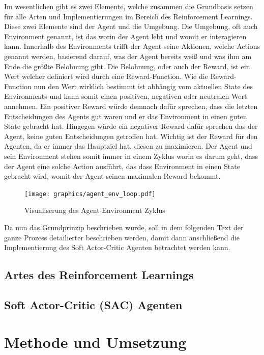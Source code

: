 \documentclass[]{iat}
\begin{document}
Im wesentlichen gibt es zwei Elemente, welche zusammen die Grundbasis setzen für alle Arten und Implementierungen im Bereich des Reinforcement Learnings. Diese zwei Elemente sind der Agent und die Umgebung. Die Umgebung, oft auch Environment genannt, ist das worin der Agent lebt und womit er interagieren kann. Innerhalb des Environments trifft der Agent seine Aktionen, welche Actions genannt werden, basierend darauf, was der Agent bereits weiß und was ihm am Ende die größte Belohnung gibt. Die Belohnung, oder auch der Reward, ist ein Wert welcher definiert wird durch eine Reward-Function. Wie die Reward-Function nun den Wert wirklich bestimmt ist abhängig vom aktuellen State des Environments und kann somit einen positiven, negativen oder neutralen Wert annehmen. Ein positiver Reward würde demnach dafür sprechen, dass die letzten Entscheidungen des Agents gut waren und er das Environment in einen guten State gebracht hat. Hingegen würde ein negativer Reward dafür sprechen das der Agent, keine guten Entscheidungen getroffen hat. Wichtig ist der Reward für den Agenten, da er immer das Hauptziel hat, diesen zu maximieren. Der Agent und sein Environment stehen somit immer in einem Zyklus worin es darum geht, dass der Agent eine solche Action ausführt, das dass Environment in einen State gebracht wird, womit der Agent seinen maximalen Reward bekommt.
\begin{figure}[H]
    \texttt{[image: graphics/agent\_env\_loop.pdf]}
    \centering
    \caption{Visualiserung des Agent-Environment Zyklus}
    \label{abb:agent_env_loop}
\end{figure}
Da nun das Grundprinzip beschrieben wurde, soll in dem folgenden Text der ganze Prozess detailierter beschrieben werden, damit dann anschließend die Implementierung des Soft Actor-Critic Agenten betrachtet werden kann.
\section{Artes des Reinforcement Learnings}
\section{Soft Actor-Critic (SAC) Agenten}

\chapter{Methode und Umsetzung}
\end{document}
